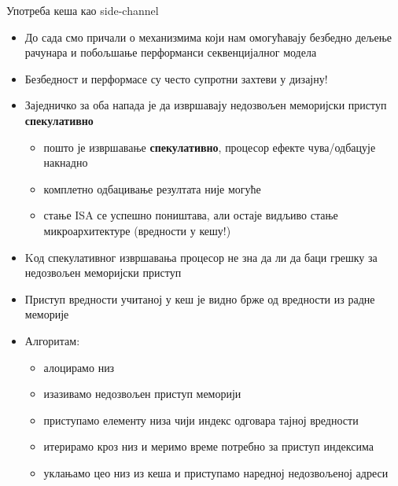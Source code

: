 \documentclass[xcolor=table]{beamer}
\begin{document}
    \begin{frame}[allowframebreaks]{Употреба кеша као side-channel}
        \begin{itemize}
            \item До сада смо причали о механизмима који нам омогућавају безбедно дељење рачунара и побољшање перформанси секвенцијалног модела
            \item Безбедност и перформасе су често супротни захтеви у дизајну!
            \item Заједничко за оба напада је да извршавају недозвољен меморијски приступ \textbf{спекулативно}
            \begin{itemize}
                \item пошто је извршавање \textbf{спекулативно}, процесор ефекте чува/одбацује накнадно
                \item комплетно одбацивање резултата није могуће
                \item стање ISA се успешно поништава, али остаје видљиво стање микроархитектуре (вредности у кешу!)
            \end{itemize}
        \end{itemize}
        
        \framebreak
        
        \begin{itemize}
            \item Kод спекулативног извршавања процесор не зна да ли да баци грешку за недозвољен меморијски приступ
            \item Приступ вредности учитаној у кеш је видно брже од вредности из радне меморије
            \item Алгоритам:
            \begin{itemize}
                \item алоцирамо низ
                \item изазивамо недозвољен приступ меморији
                \item приступамо елементу низа чији индекс одговара тајној вредности
                \item итерирамо кроз низ и меримо време потребно за приступ индексима
                \item уклањамо цео низ из кеша и приступамо наредној недозвољеној адреси
            \end{itemize}
        \end{itemize}
        

\end{frame}
\end{document}
